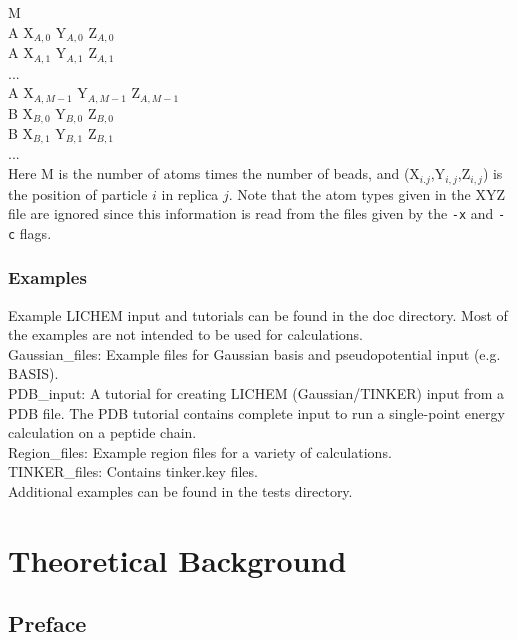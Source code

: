 \documentclass[12pt]{report}
\begin{document}
M \\

A  X$_{A,0}$  Y$_{A,0}$  Z$_{A,0}$ \\
A  X$_{A,1}$  Y$_{A,1}$  Z$_{A,1}$ \\
... \\
A  X$_{A,M-1}$  Y$_{A,M-1}$  Z$_{A,M-1}$ \\
B  X$_{B,0}$  Y$_{B,0}$  Z$_{B,0}$ \\
B  X$_{B,1}$  Y$_{B,1}$  Z$_{B,1}$ \\
... \\

Here M is the number of atoms times the number of beads, and
(X$_{i.j}$,Y$_{i,j}$,Z$_{i,j}$) is the position of particle $i$ in replica
$j$.
Note that the atom types given in the XYZ file are ignored since this
information is read from the files given by the \texttt{-x} and \texttt{-c}
flags.

\subsection{Examples}

Example LICHEM input and tutorials can be found in the doc directory.
Most of the examples are not intended to be used for calculations. \\

Gaussian\_files: Example files for Gaussian basis and pseudopotential
input (e.g. BASIS). \\

PDB\_input: A tutorial for creating LICHEM (Gaussian/TINKER) input from a
PDB file.
The PDB tutorial contains complete input to run a single-point energy
calculation on a peptide chain. \\

Region\_files: Example region files for a variety of calculations. \\

TINKER\_files: Contains tinker.key files. \\

Additional examples can be found in the tests directory.

\chapter{Theoretical Background}
\label{chap:Theory}

\section{Preface}
\end{document}
